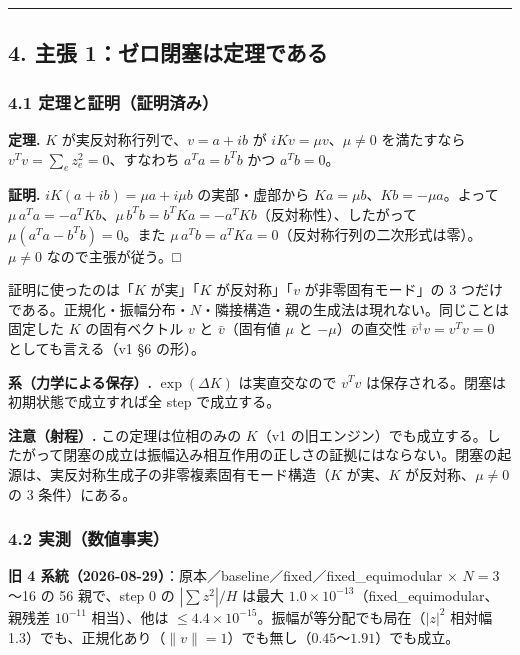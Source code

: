 \documentclass[
  10pt,
  a4paper,
]{ltjsarticle}
\begin{document}
\begin{center}\rule{0.5\linewidth}{0.5pt}\end{center}

\subsection{4. 主張
1：ゼロ閉塞は定理である}\label{ux4e3bux5f35-1ux30bcux30edux9589ux585eux306fux5b9aux7406ux3067ux3042ux308b}

\subsubsection{4.1
定理と証明（証明済み）}\label{ux5b9aux7406ux3068ux8a3cux660eux8a3cux660eux6e08ux307f}

\textbf{定理.} \(K\) が実反対称行列で、\(v=a+ib\) が
\(iKv=\mu v\)、\(\mu\ne0\) を満たすなら
\(v^Tv=\sum_e z_e^2=0\)、すなわち \(a^Ta=b^Tb\) かつ \(a^Tb=0\)。

\textbf{証明.} \(iK(a+ib)=\mu a+i\mu b\) の実部・虚部から
\(Ka=\mu b\)、\(Kb=-\mu a\)。よって
\(\mu\,a^Ta=-a^TKb\)、\(\mu\,b^Tb=b^TKa=-a^TKb\)（反対称性）、したがって
\(\mu(a^Ta-b^Tb)=0\)。また
\(\mu\,a^Tb=a^TKa=0\)（反対称行列の二次形式は零）。\(\mu\ne0\)
なので主張が従う。□

証明に使ったのは「\(K\) が実」「\(K\) が反対称」「\(v\)
が非零固有モード」の 3
つだけである。正規化・振幅分布・\(N\)・隣接構造・親の生成法は現れない。同じことは固定した
\(K\) の固有ベクトル \(v\) と \(\bar v\)（固有値 \(\mu\) と
\(-\mu\)）の直交性 \(\bar v^\dagger v=v^Tv=0\) としても言える（v1 §6
の形）。

\textbf{系（力学による保存）.} \(\exp(\Delta K)\) は実直交なので
\(v^Tv\) は保存される。閉塞は初期状態で成立すれば全 step で成立する。

\textbf{注意（射程）.} この定理は位相のみの \(K\)（v1
の旧エンジン）でも成立する。したがって閉塞の成立は振幅込み相互作用の正しさの証拠にはならない。閉塞の起源は、実反対称生成子の非零複素固有モード構造（\(K\)
が実、\(K\) が反対称、\(\mu\ne0\) の 3 条件）にある。

\subsubsection{4.2
実測（数値事実）}\label{ux5b9fux6e2cux6570ux5024ux4e8bux5b9f}

\textbf{旧 4
系統（2026-08-29）}：原本／baseline／fixed／fixed\_equimodular ×
\(N=3\)〜16 の 56 親で、step 0 の \(|\sum z^2|/H\) は最大
\(1.0\times10^{-13}\)（fixed\_equimodular、親残差 \(10^{-11}\)
相当）、他は \(\le4.4\times10^{-15}\)。振幅が等分配でも局在（\(|z|^2\)
相対幅
1.3）でも、正規化あり（\(\|v\|=1\)）でも無し（\(0.45\)〜\(1.91\)）でも成立。
\end{document}

